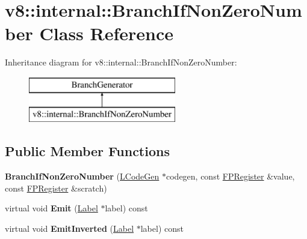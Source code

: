 \hypertarget{classv8_1_1internal_1_1_branch_if_non_zero_number}{}\section{v8\+:\+:internal\+:\+:Branch\+If\+Non\+Zero\+Number Class Reference}
\label{classv8_1_1internal_1_1_branch_if_non_zero_number}
Inheritance diagram for v8\+:\+:internal\+:\+:Branch\+If\+Non\+Zero\+Number\+:\begin{figure}[H]
\begin{center}
\leavevmode
\includegraphics[height=2.000000cm]{classv8_1_1internal_1_1_branch_if_non_zero_number}
\end{center}
\end{figure}
\subsection*{Public Member Functions}
\begin{DoxyCompactItemize}
\item 
{\bfseries Branch\+If\+Non\+Zero\+Number} (\hyperlink{classv8_1_1internal_1_1_l_code_gen}{L\+Code\+Gen} $\ast$codegen, const \hyperlink{structv8_1_1internal_1_1_f_p_register}{F\+P\+Register} \&value, const \hyperlink{structv8_1_1internal_1_1_f_p_register}{F\+P\+Register} \&scratch)\hypertarget{classv8_1_1internal_1_1_branch_if_non_zero_number_a3064a272b09fb9ea1f6f0794ac7716ba}{}\label{classv8_1_1internal_1_1_branch_if_non_zero_number_a3064a272b09fb9ea1f6f0794ac7716ba}

\item 
virtual void {\bfseries Emit} (\hyperlink{classv8_1_1internal_1_1_label}{Label} $\ast$label) const \hypertarget{classv8_1_1internal_1_1_branch_if_non_zero_number_a88f4ce559cc014b6a094afb2e9fee192}{}\label{classv8_1_1internal_1_1_branch_if_non_zero_number_a88f4ce559cc014b6a094afb2e9fee192}

\item 
virtual void {\bfseries Emit\+Inverted} (\hyperlink{classv8_1_1internal_1_1_label}{Label} $\ast$label) const \hypertarget{classv8_1_1internal_1_1_branch_if_non_zero_number_af8c55ca830e3ff235172a41a3fd4259c}{}\label{classv8_1_1internal_1_1_branch_if_non_zero_number_af8c55ca830e3ff235172a41a3fd4259c}

\end{DoxyCompactItemize}
